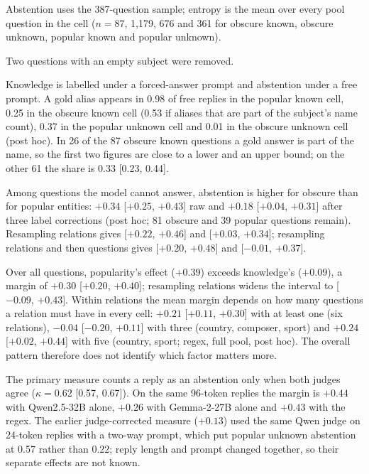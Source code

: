 
Abstention uses the 387-question sample; entropy is the mean over every pool question in the cell ($n=87$, 1{,}179, 676 and 361 for obscure known, obscure unknown, popular known and popular unknown).

Two questions with an empty subject were removed.

Knowledge is labelled under a forced-answer prompt and abstention under a free prompt. A gold alias appears in 0.98 of free replies in the popular known cell, 0.25 in the obscure known cell (0.53 if aliases that are part of the subject's name count), 0.37 in the popular unknown cell and 0.01 in the obscure unknown cell (post hoc). In 26 of the 87 obscure known questions a gold answer is part of the name, so the first two figures are close to a lower and an upper bound; on the other 61 the share is 0.33 [0.23, 0.44].

Among questions the model cannot answer, abstention is higher for obscure than for popular entities: $+0.34$ [$+0.25$, $+0.43$] raw and $+0.18$ [$+0.04$, $+0.31$] after three label corrections (post hoc; 81 obscure and 39 popular questions remain). Resampling relations gives [$+0.22$, $+0.46$] and [$+0.03$, $+0.34$]; resampling relations and then questions gives [$+0.20$, $+0.48$] and [$-0.01$, $+0.37$].

Over all questions, popularity's effect ($+0.39$) exceeds knowledge's ($+0.09$), a margin of $+0.30$ [$+0.20$, $+0.40$]; resampling relations widens the interval to [$-0.09$, $+0.43$]. Within relations the mean margin depends on how many questions a relation must have in every cell: $+0.21$ [$+0.11$, $+0.30$] with at least one (six relations), $-0.04$ [$-0.20$, $+0.11$] with three (country, composer, sport) and $+0.24$ [$+0.02$, $+0.44$] with five (country, sport; regex, full pool, post hoc). The overall pattern therefore does not identify which factor matters more.


The primary measure counts a reply as an abstention only when both judges agree ($\kappa=0.62$ [0.57, 0.67]). On the same 96-token replies the margin is $+0.44$ with Qwen2.5-32B alone, $+0.26$ with Gemma-2-27B alone and $+0.43$ with the regex. The earlier judge-corrected measure ($+0.13$) used the same Qwen judge on 24-token replies with a two-way prompt, which put popular unknown abstention at 0.57 rather than 0.22; reply length and prompt changed together, so their separate effects are not known.

